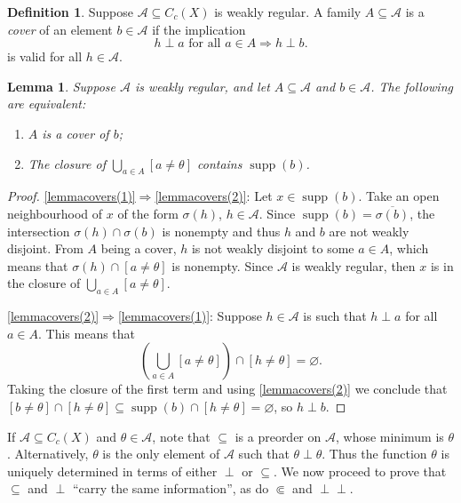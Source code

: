 \documentclass[letter,11pt]{amsart}
\theoremstyle{plain}		\newtheorem{theorem}[generalnumbering]{Theorem}
\theoremstyle{plain}		\newtheorem{corollary}[generalnumbering]{Corollary}
\theoremstyle{definition}		\newtheorem{definition}[generalnumbering]{Definition}
\theoremstyle{definition}		\newtheorem{example}[generalnumbering]{Example}
\theoremstyle{plain}		\newtheorem{proposition}[generalnumbering]{Proposition}
\theoremstyle{plain}		\newtheorem{lemma}[generalnumbering]{Lemma}
\theoremstyle{plain}    \newtheorem{plainstyle}[generalnumbering]{\namefordifferentenvironment}
\theoremstyle{plain}    \newtheorem*{plainstyle*}{\namefordifferentenvironment}
\theoremstyle{definition}    \newtheorem{definitionstyle}[generalnumbering]{\namefordifferentenvironment}
\theoremstyle{definition}    \newtheorem*{definitionstyle*}{\namefordifferentenvironment}
\newcommand{\perpp}{\perp\!\!\!\perp}
\DeclareMathOperator{\supp}{supp}
\begin{document}
\begin{definition}\label{definitiondisjointcover}
	Suppose $\mathcal{A}\subseteq C_c(X)$ is weakly regular. A family $A\subseteq\mathcal{A}$ is a \emph{cover} of an element $b\in\mathcal{A}$ if the implication
	\[h\perp a\text{ for all }a\in A\Longrightarrow h\perp b.\]
	is valid for all $h\in\mathcal{A}$.
\end{definition}

\begin{lemma}\label{lemmacovers}
	Suppose $\mathcal{A}$ is weakly regular, and let $A\subseteq\mathcal{A}$ and $b\in\mathcal{A}$. The following are equivalent:
	\begin{enumerate}[label=(\arabic*)]
		\item\label{lemmacovers(1)} $A$ is a cover of $b$;
		\item\label{lemmacovers(2)} The closure of $\bigcup_{a\in A}[a\neq\theta]$ contains $\supp(b)$.
	\end{enumerate}
\end{lemma}
\begin{proof}
	\ref{lemmacovers(1)}$\Rightarrow$\ref{lemmacovers(2)}: Let $x\in\supp(b)$. Take an open neighbourhood of $x$ of the form $\sigma(h)$, $h\in\mathcal{A}$. Since $\supp(b)=\overline{\sigma(b)}$, the intersection $\sigma(h)\cap\sigma(b)$ is nonempty and thus $h$ and $b$ are not weakly disjoint. From $A$ being a cover, $h$ is not weakly disjoint to some $a\in A$, which means that $\sigma(h)\cap[a\neq\theta]$ is nonempty. Since $\mathcal{A}$ is weakly regular, then $x$ is in the closure of $\bigcup_{a\in A}[a\neq\theta]$.
	
	\ref{lemmacovers(2)}$\Rightarrow$\ref{lemmacovers(1)}: Suppose $h\in\mathcal{A}$ is such that $h\perp a$ for all $a\in A$. This means that
	\[(\bigcup_{a\in A}[a\neq\theta])\cap[h\neq\theta]=\varnothing.\]
	Taking the closure of the first term and using \ref{lemmacovers(2)} we conclude that $[b\neq\theta]\cap[h\neq\theta]\subseteq\supp(b)\cap[h\neq\theta]=\varnothing$, so $h\perp b$.
\end{proof}

If $\mathcal{A}\subseteq C_c(X)$ and $\theta\in\mathcal{A}$, note that $\subseteq$ is a preorder on $\mathcal{A}$, whose minimum is $\theta$. Alternatively, $\theta$ is the only element of $\mathcal{A}$ such that $\theta\perp\theta$. Thus the function $\theta$ is uniquely determined in terms of either $\perp$ or $\subseteq$. We now proceed to prove that $\subseteq$ and $\perp$ ``carry the same information'', as do $\Subset$ and $\perpp$.
\end{document}
